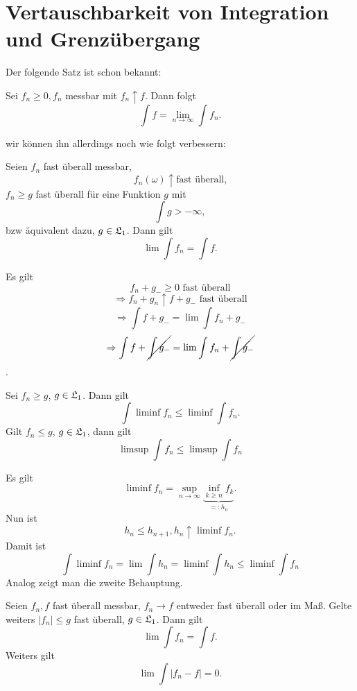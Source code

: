 		\section[Integration$\leftrightarrow$Grenzwert]{Vertauschbarkeit von Integration und Grenzübergang}
			Der folgende Satz ist schon bekannt:
			\begin{satz}
				Sei $f_n\ge 0, f_n$ messbar mit $f_n\uparrow f$. Dann folgt
				\[ \int f=\lim_{n\to\infty}\int f_n. \] 
			\end{satz}
			wir können ihn allerdings noch wie folgt verbessern:
			\begin{satz}
				Seien $f_n$ fast überall messbar, 
				\[ f_n(\omega)\uparrow \text{fast überall,} \]
				 $f_n\ge g$ fast überall für eine Funktion $g$ mit 
				 \[ \int g>-\infty, \]
				 bzw äquivalent dazu, $g\in\mathfrak{L}_1$. Dann gilt
				 \[ \lim \int f_n=\int f. \] 
			\end{satz}
			\begin{bew}
				Es gilt
				\[ f_n+g_-\ge 0\text{ fast überall} \]
				\[ \Rightarrow f_n+g_n\uparrow f+g_-\text{ fast überall} \]
				\[ \Rightarrow \int f+g_-=\lim\int f_n+g_- \]
				\[ \Rightarrow \int f+\cancel{\int g_-}=\lim\int f_n +\cancel{\int g_-} \].
			\end{bew}
			
			\begin{lemma}[Fatou]
				Sei $f_n\ge g$, $g\in\mathfrak{L}_1$. Dann gilt
				\[ \int \liminf f_n\le\liminf\int f_n. \]
				Gilt $f_n\le g$, $g\in\mathfrak{L}_1$, dann gilt
				\[ \limsup\int f_n\le\limsup\int f_n \]
			\end{lemma}
			
			\begin{bew}
				Es gilt
				\[ \liminf f_n=\sup_{n\to\infty}\underbrace{\inf_{k\ge n} f_k}_{=:h_n}. \]
				Nun ist
				\[ h_n\le h_{n+1}, h_n\uparrow \liminf f_n. \]
				Damit ist
				\[ \int \liminf f_n=\lim\int h_n=\liminf \int h_n\le\liminf\int f_n \]
				Analog zeigt man die zweite Behauptung. 
			\end{bew}
			
			\begin{satz}
				Seien $f_n,f$ fast überall messbar, $f_n\to f$ entweder fast überall oder im Maß. Gelte weiters $|f_n|\le g$ fast überall, $g\in\mathfrak{L}_1$. Dann gilt
				\[ \lim\int f_n=\int f. \]
				Weiters gilt
				\[ \lim\int |f_n-f|=0. \]
			\end{satz}
			
